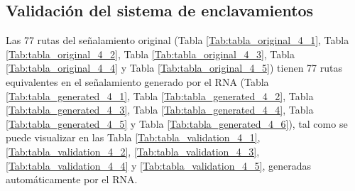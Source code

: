 \subsection{Validación del sistema de enclavamientos}

    Las 77 rutas del señalamiento original (Tabla \ref{Tab:tabla_original_4_1}, Tabla \ref{Tab:tabla_original_4_2}, Tabla \ref{Tab:tabla_original_4_3}, Tabla \ref{Tab:tabla_original_4_4} y Tabla \ref{Tab:tabla_original_4_5}) tienen 77 rutas equivalentes en el señalamiento generado por el RNA (Tabla \ref{Tab:tabla_generated_4_1}, Tabla \ref{Tab:tabla_generated_4_2}, Tabla \ref{Tab:tabla_generated_4_3}, Tabla \ref{Tab:tabla_generated_4_4}, Tabla \ref{Tab:tabla_generated_4_5} y Tabla \ref{Tab:tabla_generated_4_6}), tal como se puede visualizar en las Tabla \ref{Tab:tabla_validation_4_1}, \ref{Tab:tabla_validation_4_2}, \ref{Tab:tabla_validation_4_3}, \ref{Tab:tabla_validation_4_4} y \ref{Tab:tabla_validation_4_5}, generadas automáticamente por el RNA.

